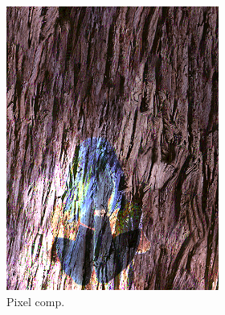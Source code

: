 \begin{figure}[]
\begin{subfigure}{\textwidth}
\begin{subfigure}{0.24\textwidth}
            \includegraphics[width=\textwidth]{images/04-experiment02/human/wood/pixel_im.jpg}
            \caption*{Pixel comp.}
        \end{subfigure}
        \hfill
        \begin{subfigure}{0.24\textwidth}
            \centering

\end{subfigure}
\end{subfigure}
\end{figure}
